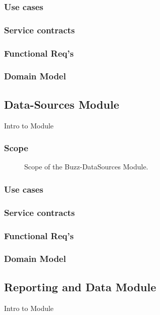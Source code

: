 \documentclass[12pt]{article}
\begin{document}
\subsubsection{Use cases}
\subsubsection{Service contracts}
\subsubsection{Functional Req's}
\subsubsection{Domain Model}

\subsection{Data-Sources Module}
\par{Intro to Module}
\subsubsection{Scope}
\par{}

\begin{figure}[h]
\iffalse\texttt{[image: Diagrams/scopeDataSources.jpeg]}\fi
\caption{Scope of the Buzz-DataSources Module.}
\label{Use-case: Buzz-Data Sources}
\end{figure}

\subsubsection{Use cases}
\subsubsection{Service contracts}
\subsubsection{Functional Req's}
\subsubsection{Domain Model}

\subsection{Reporting and Data Module}
\par{Intro to Module}
\end{document}
